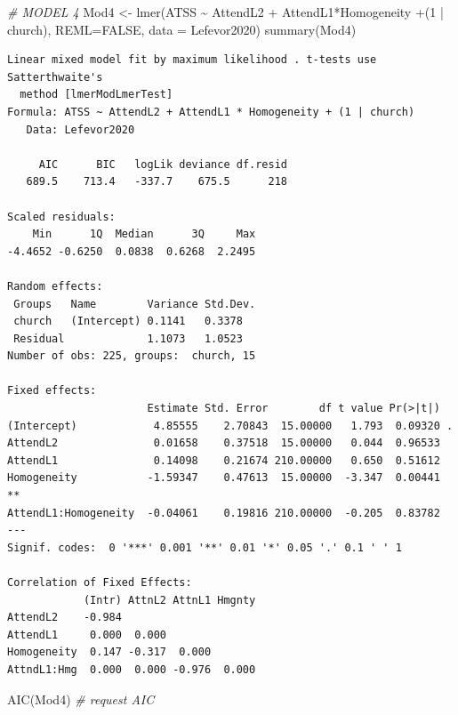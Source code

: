 \documentclass[
  english,
]{book}
\newenvironment{Shaded}{\begin{snugshade}}{\end{snugshade}}
\newcommand{\AttributeTok}[1]{\textcolor[rgb]{0.77,0.63,0.00}{#1}}
\newcommand{\CommentTok}[1]{\textcolor[rgb]{0.56,0.35,0.01}{\textit{#1}}}
\newcommand{\ConstantTok}[1]{\textcolor[rgb]{0.00,0.00,0.00}{#1}}
\newcommand{\DecValTok}[1]{\textcolor[rgb]{0.00,0.00,0.81}{#1}}
\newcommand{\FunctionTok}[1]{\textcolor[rgb]{0.00,0.00,0.00}{#1}}
\newcommand{\NormalTok}[1]{#1}
\newcommand{\OtherTok}[1]{\textcolor[rgb]{0.56,0.35,0.01}{#1}}
\newcommand{\SpecialCharTok}[1]{\textcolor[rgb]{0.00,0.00,0.00}{#1}}
\begin{document}
\begin{Shaded}
\begin{Highlighting}[]
\CommentTok{\# MODEL 4}
\NormalTok{Mod4 }\OtherTok{\textless{}{-}} \FunctionTok{lmer}\NormalTok{(ATSS }\SpecialCharTok{\textasciitilde{}}\NormalTok{ AttendL2 }\SpecialCharTok{+}\NormalTok{ AttendL1}\SpecialCharTok{*}\NormalTok{Homogeneity }\SpecialCharTok{+}\NormalTok{(}\DecValTok{1} \SpecialCharTok{|}\NormalTok{ church), }\AttributeTok{REML=}\ConstantTok{FALSE}\NormalTok{, }\AttributeTok{data =}\NormalTok{ Lefevor2020)}
\FunctionTok{summary}\NormalTok{(Mod4)}
\end{Highlighting}
\end{Shaded}

\begin{verbatim}
Linear mixed model fit by maximum likelihood . t-tests use Satterthwaite's
  method [lmerModLmerTest]
Formula: ATSS ~ AttendL2 + AttendL1 * Homogeneity + (1 | church)
   Data: Lefevor2020

     AIC      BIC   logLik deviance df.resid 
   689.5    713.4   -337.7    675.5      218 

Scaled residuals: 
    Min      1Q  Median      3Q     Max 
-4.4652 -0.6250  0.0838  0.6268  2.2495 

Random effects:
 Groups   Name        Variance Std.Dev.
 church   (Intercept) 0.1141   0.3378  
 Residual             1.1073   1.0523  
Number of obs: 225, groups:  church, 15

Fixed effects:
                      Estimate Std. Error        df t value Pr(>|t|)   
(Intercept)            4.85555    2.70843  15.00000   1.793  0.09320 . 
AttendL2               0.01658    0.37518  15.00000   0.044  0.96533   
AttendL1               0.14098    0.21674 210.00000   0.650  0.51612   
Homogeneity           -1.59347    0.47613  15.00000  -3.347  0.00441 **
AttendL1:Homogeneity  -0.04061    0.19816 210.00000  -0.205  0.83782   
---
Signif. codes:  0 '***' 0.001 '**' 0.01 '*' 0.05 '.' 0.1 ' ' 1

Correlation of Fixed Effects:
            (Intr) AttnL2 AttnL1 Hmgnty
AttendL2    -0.984                     
AttendL1     0.000  0.000              
Homogeneity  0.147 -0.317  0.000       
AttndL1:Hmg  0.000  0.000 -0.976  0.000
\end{verbatim}

\begin{Shaded}
\begin{Highlighting}[]
\FunctionTok{AIC}\NormalTok{(Mod4) }\CommentTok{\# request AIC}
\end{Highlighting}
\end{Shaded}
\end{document}
